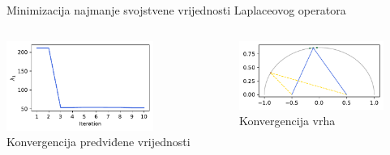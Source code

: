 \documentclass[croatian, 12pt, usepdftitle = false, xcolor = {{usenames, dvipsnames, svgnames, x11names}}, hyperref = {unicode}]{beamer}
\begin{document}
\begin{frame}{Minimizacija najmanje svojstvene vrijednosti Laplaceovog operatora}
{            \centering
            \begin{columns}
                \begin{column}{0.5\textwidth}
                    \centering
                    \includegraphics[width = 48mm]{figures/neural_network_minimisation_values.pdf}
                    \\
                    Konvergencija predviđene vrijednosti
                \end{column}
                \begin{column}{0.5\textwidth}
                    \centering
                    \includegraphics[width = 47mm]{figures/neural_network_minimisation_vertices.pdf}
                    \\
                    Konvergencija vrha
                \end{column}
            \end{columns}%
        }%
\end{frame}
\end{document}

